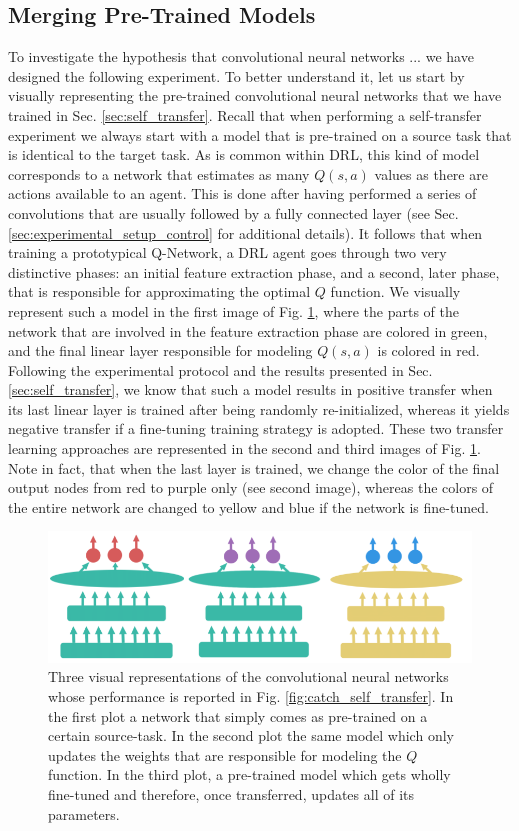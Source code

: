 \subsection{Merging Pre-Trained Models}
To investigate the hypothesis that convolutional neural networks ... we have designed the following experiment. To better understand it, let us start by visually representing the pre-trained convolutional neural networks that we have trained in Sec. \ref{sec:self_transfer}. Recall that when performing a self-transfer experiment we always start with a model that is pre-trained on a source task that is identical to the target task. As is common within DRL, this kind of model corresponds to a network that estimates as many $Q(s,a)$ values as there are actions available to an agent. This is done after having performed a series of convolutions that are usually followed by a fully connected layer (see Sec. \ref{sec:experimental_setup_control} for additional details). It follows that when training a prototypical Q-Network, a DRL agent goes through two very distinctive phases: an initial feature extraction phase, and a second, later phase, that is responsible for approximating the optimal $Q$ function. We visually represent such a model in the first image of Fig. \ref{fig:networks}, where the parts of the network that are involved in the feature extraction phase are colored in green, and the final linear layer responsible for modeling $Q(s,a)$ is colored in red. Following the experimental protocol and the results presented in Sec. \ref{sec:self_transfer}, we know that such a model results in positive transfer when its last linear layer is trained after being randomly re-initialized, whereas it yields negative transfer if a fine-tuning training strategy is adopted. These two transfer learning approaches are represented in the second and third images of Fig. \ref{fig:networks}. Note in fact, that when the last layer is trained, we change the color of the final output nodes from red to purple only (see second image), whereas the colors of the entire network are changed to yellow and blue if the network is fine-tuned.  

\begin{figure}[ht!]
\centering
\includegraphics[width=\textwidth]{./Images/Chapter08/networks}
\caption{Three visual representations of the convolutional neural networks whose performance is reported in Fig. \ref{fig:catch_self_transfer}. In the first plot a network that simply comes as pre-trained on a certain source-task. In the second plot the same model which only updates the weights that are responsible for modeling the $Q$ function. In the third plot, a pre-trained model which gets wholly fine-tuned and therefore, once transferred, updates all of its parameters.}
\label{fig:networks}
\end{figure}

